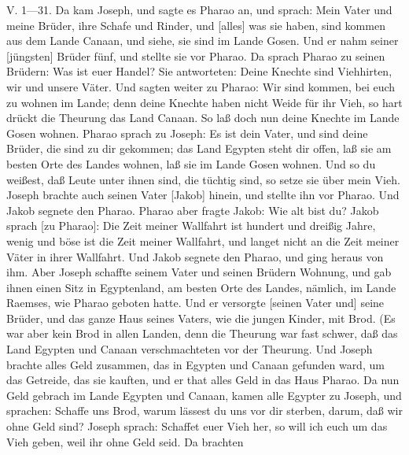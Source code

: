 V. 1—31. Da kam Joseph, und sagte es Pharao an, und sprach: Mein Vater und meine Brüder, ihre Schafe und Rinder, und [alles] was sie haben, sind kommen aus dem Lande Canaan, und siehe, sie sind im Lande Gosen. Und er nahm seiner [jüngsten] Brüder fünf, und stellte sie vor Pharao. Da sprach Pharao zu seinen Brüdern: Was ist euer Handel? Sie antworteten: Deine Knechte sind Viehhirten, wir und unsere Väter. Und sagten weiter zu Pharao: Wir sind kommen, bei euch zu wohnen im Lande; denn deine Knechte haben nicht Weide für ihr Vieh, so hart drückt die Theurung das Land Canaan. So laß doch nun deine Knechte im Lande Gosen wohnen. Pharao sprach zu Joseph: Es ist dein Vater, und sind deine Brüder, die sind zu dir gekommen; das Land Egypten steht dir offen, laß sie am besten Orte des Landes wohnen, laß sie im Lande Gosen wohnen. Und so du weißest, daß Leute unter ihnen sind, die tüchtig sind, so setze sie über mein Vieh. Joseph brachte auch seinen Vater [Jakob] hinein, und stellte ihn vor Pharao. Und Jakob segnete den Pharao. Pharao aber fragte Jakob: Wie alt bist du? Jakob sprach [zu Pharao]: Die Zeit meiner Wallfahrt ist hundert und dreißig Jahre, wenig und böse ist die Zeit meiner Wallfahrt, und langet nicht an die Zeit meiner Väter in ihrer Wallfahrt. Und Jakob segnete den Pharao, und ging heraus von ihm. Aber Joseph schaffte seinem Vater und seinen Brüdern Wohnung, und gab ihnen einen Sitz in Egyptenland, am besten Orte des Landes, nämlich, im Lande Raemses, wie Pharao geboten hatte. Und er versorgte [seinen Vater und] seine Brüder, und das ganze Haus seines Vaters, wie die jungen Kinder, mit Brod. (Es war aber kein Brod in allen Landen, denn die Theurung war fast schwer, daß das Land Egypten und Canaan verschmachteten vor der Theurung. Und Joseph brachte alles Geld zusammen, das in Egypten und Canaan gefunden ward, um das Getreide, das sie kauften, und er that alles Geld in das Haus Pharao. Da nun Geld gebrach im Lande Egypten und Canaan, kamen alle Egypter zu Joseph, und sprachen: Schaffe uns Brod, warum lässest du uns vor dir sterben, darum, daß wir ohne Geld sind? Joseph sprach: Schaffet euer Vieh her, so will ich euch um das Vieh geben, weil ihr ohne Geld seid. Da brachten
